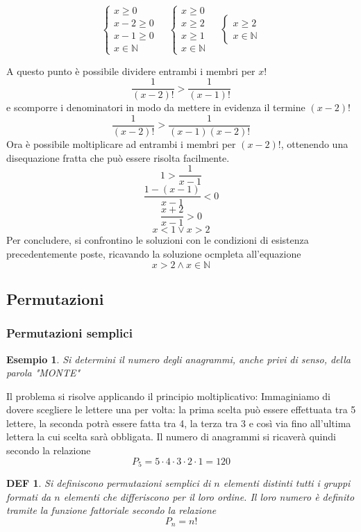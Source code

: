 \documentclass{article}     %
\newtheorem*{definition}{DEF}
\newtheorem{ex}{Esempio}[section]
\begin{document}
            \[ \left\{
            \begin{array}{c}
                 x\geq 0 \\
                 x-2\geq 0 \\
                 x-1\geq 0 \\
                 x \in \mathbb{N}
            \end{array} \right. ~~~~~
            \left\{
            \begin{array}{c}
                 x\geq 0 \\
                 x\geq 2 \\
                 x\geq 1\\
                 x \in \mathbb{N}
            \end{array} \right. ~~~~~
            \left\{
            \begin{array}{c}
                x\geq 2\\
                x \in \mathbb{N}
           \end{array} \right.
           \]
           
           A questo punto è possibile dividere entrambi i membri per $x!$ \[\frac{1}{(x-2)!}>\frac{1}{(x-1)!}\] e scomporre i denominatori in modo da mettere in evidenza il termine $(x-2)!$ \[\frac{1}{(x-2)!}>\frac{1}{(x-1)(x-2)!}\]
           Ora è possibile moltiplicare ad entrambi i membri per $(x-2)!$, ottenendo una disequazione fratta che può essere risolta facilmente. 
           \[1>\frac{1}{x-1}\] \[\frac{1-(x-1)}{x-1}<0\] \[\frac{x+2}{x-1}>0\] \[x<1 \lor x>2\]
           Per concludere, si confrontino le soluzioni con le condizioni di esistenza precedentemente poste, ricavando la soluzione ocmpleta all'equazione \[x>2 \land x\in \mathbb{N}\]
           \subsection{Permutazioni}
            \subsubsection{Permutazioni semplici} 
            \begin{ex}
                Si determini il numero degli anagrammi, anche privi di senso, della parola "MONTE"
            \end{ex}
            
            Il problema si risolve applicando il principio moltiplicativo: Immaginiamo di dovere scegliere le lettere una per volta: la prima scelta può essere effettuata tra 5 lettere, la seconda potrà essere fatta tra 4, la terza tra 3 e così via fino all'ultima lettera la cui scelta sarà obbligata. Il numero di anagrammi si ricaverà quindi secondo la relazione \[P_5=5\cdot4\cdot3\cdot2\cdot1=120\]
            \begin{definition}
                Si definiscono permutazioni semplici di $n$ elementi distinti tutti i gruppi formati da $n$ elementi che differiscono per il loro ordine. Il loro numero è definito tramite la funzione fattoriale secondo la relazione \[P_n=n!\]
            \end{definition}
            
\end{document}
